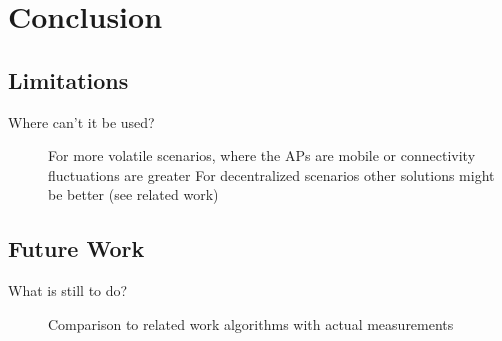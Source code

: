 \chapter{Conclusion}
\section{Limitations}
  \begin{description}
   \item[Where can't it be used?]
    For more volatile scenarios, where the APs are mobile or connectivity fluctuations are greater \newline
    For decentralized scenarios other solutions might be better (see related work) \newline
  \end{description}
\section{Future Work}
  \begin{description}
   \item [What is still to do?]
    Comparison to related work algorithms with actual measurements\newline
  \end{description}